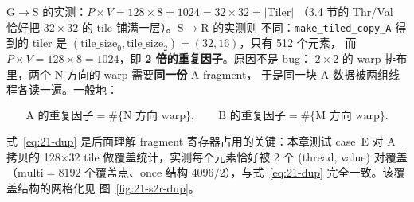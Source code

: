 G$\to$S 的实测：$P\times V = 128\times 8 = 1024 = 32\times 32 = |\mathrm{Tiler}|$
（3.4 节的 Thr/Val 恰好把 $32\times32$ 的 tile 铺满一层）。S$\to$R 的实测则
不同：\texttt{make\_\allowbreak{}tiled\_\allowbreak{}copy\_\allowbreak{}A} 得到的 tiler 是
$(\mathrm{tile\_size}_0, \mathrm{tile\_size}_2) = (32,16)$，只有 512 个元素，
而 $P\times V = 128\times 8 = 1024$，即 \textbf{2 倍的重复因子}。原因不是 bug：
$2\times2$ 的 warp 排布里，两个 N 方向的 warp 需要\textbf{同一份} A fragment，
于是同一块 A 数据被两组线程各读一遍。一般地：

\begin{equation}
  \text{A 的重复因子} = \#\{\text{N 方向 warp}\},\qquad
  \text{B 的重复因子} = \#\{\text{M 方向 warp}\} .
  \label{eq:21-dup}
\end{equation}

式~\eqref{eq:21-dup} 是后面理解 fragment 寄存器占用的关键：本章测试 case~E
对 A 拷贝的 128$\times$32 tile 做覆盖统计，实测每个元素恰好被 2 个
(thread, value) 对覆盖（$\mathrm{multi}=8192$ 个覆盖点、$\mathrm{once}$ 结构
$4096/2$），与式~\eqref{eq:21-dup} 完全一致。该覆盖结构的网格化见
图~\ref{fig:21-s2r-dup}。

